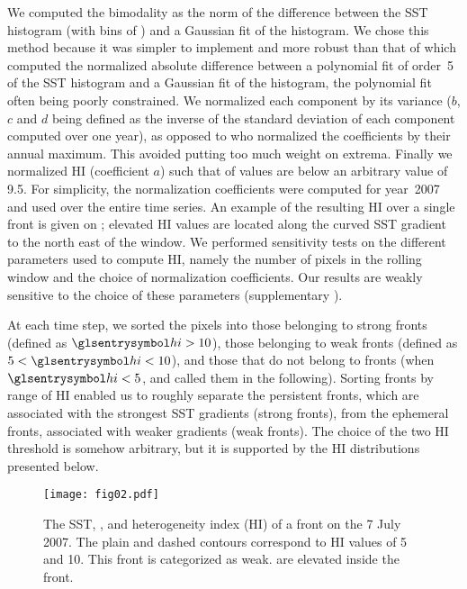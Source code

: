 We computed the bimodality as the  norm of the difference between the SST histogram (with bins of ) and a Gaussian fit of the histogram.
We chose this method because it was simpler to implement and more robust than that of \textcite{liu_2016} which computed the normalized absolute difference between a polynomial fit of order~5 of the SST histogram and a Gaussian fit of the histogram, the polynomial fit often being poorly constrained.
We normalized each component by its variance (\(b\), \(c\) and \(d\) being defined as the inverse of the standard deviation of each component computed over one year), as opposed to \textcite{liu_2016} who normalized the coefficients by their annual maximum.
This avoided putting too much weight on extrema.
Finally we normalized HI (coefficient \(a\)) such that  of values are below an arbitrary value of \num{9.5}.
For simplicity, the normalization coefficients were computed for year~2007 and used over the entire time series.
An example of the resulting HI over a single front is given on ; elevated HI values are located along the curved SST gradient to the north east of the window.
We performed sensitivity tests on the different parameters used to compute HI, namely the number of pixels in the rolling window and the choice of normalization coefficients.
Our results are weakly sensitive to the choice of these parameters (supplementary ).

At each time step, we sorted the pixels into those belonging to strong fronts (defined as \(\am{hi} > 10\)), those belonging to weak fronts (defined as \(5 < \am{hi} < 10\)), and those that do not belong to fronts (when \(\am{hi} < 5\), and called them  in the following).
Sorting fronts by range of HI enabled us to roughly separate the persistent fronts, which are associated with the strongest SST gradients (strong fronts), from the ephemeral fronts, associated with weaker gradients (weak fronts).
The choice of the two HI threshold is somehow arbitrary, but it is supported by the HI distributions presented below.


\begin{figure*}
  \centering
  \texttt{[image: fig02.pdf]}
  \caption[Example of front]{
    The SST, , and heterogeneity index (HI) of a front on the 7 July 2007.
    The plain and dashed contours correspond to HI values of 5 and 10.
    This front is categorized as weak.
     are elevated inside the front.
  }%
  \label{fig:zoom}
\end{figure*}

